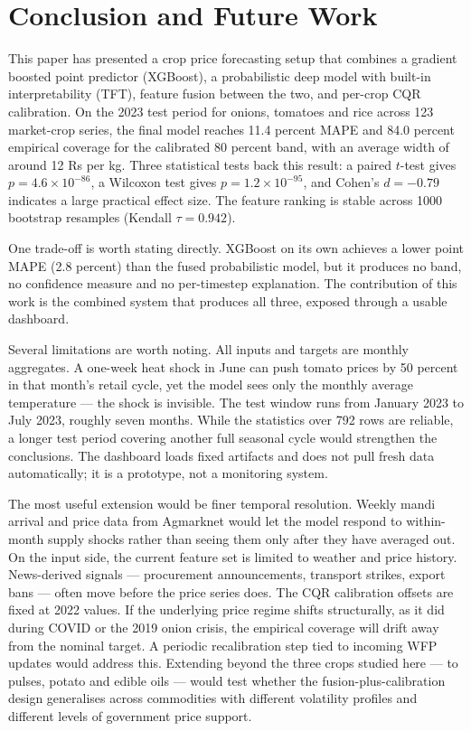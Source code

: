 \documentclass[conference,twoside]{IEEEtran}
\begin{document}
\section{Conclusion and Future Work}
\label{sec:conclusion}

This paper has presented a crop price forecasting setup that combines a gradient boosted point predictor (XGBoost), a probabilistic deep model with built-in interpretability (TFT), feature fusion between the two, and per-crop CQR calibration. On the 2023 test period for onions, tomatoes and rice across 123 market-crop series, the final model reaches 11.4 percent MAPE and 84.0 percent empirical coverage for the calibrated 80 percent band, with an average width of around 12 Rs per kg. Three statistical tests back this result: a paired $t$-test gives $p = 4.6 \times 10^{-86}$, a Wilcoxon test gives $p = 1.2 \times 10^{-95}$, and Cohen's $d = -0.79$ indicates a large practical effect size. The feature ranking is stable across 1000 bootstrap resamples (Kendall $\tau = 0.942$).

One trade-off is worth stating directly. XGBoost on its own achieves a lower point MAPE (2.8 percent) than the fused probabilistic model, but it produces no band, no confidence measure and no per-timestep explanation. The contribution of this work is the combined system that produces all three, exposed through a usable dashboard.

Several limitations are worth noting. All inputs and targets are monthly aggregates. A one-week heat shock in June can push tomato prices by 50 percent in that month's retail cycle, yet the model sees only the monthly average temperature --- the shock is invisible. The test window runs from January 2023 to July 2023, roughly seven months. While the statistics over 792 rows are reliable, a longer test period covering another full seasonal cycle would strengthen the conclusions. The dashboard loads fixed artifacts and does not pull fresh data automatically; it is a prototype, not a monitoring system.

The most useful extension would be finer temporal resolution. Weekly mandi arrival and price data from Agmarknet would let the model respond to within-month supply shocks rather than seeing them only after they have averaged out. On the input side, the current feature set is limited to weather and price history. News-derived signals --- procurement announcements, transport strikes, export bans --- often move before the price series does. The CQR calibration offsets are fixed at 2022 values. If the underlying price regime shifts structurally, as it did during COVID or the 2019 onion crisis, the empirical coverage will drift away from the nominal target. A periodic recalibration step tied to incoming WFP updates would address this. Extending beyond the three crops studied here --- to pulses, potato and edible oils --- would test whether the fusion-plus-calibration design generalises across commodities with different volatility profiles and different levels of government price support.



\end{document}
